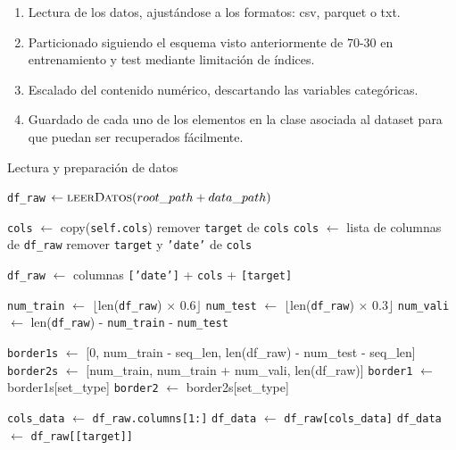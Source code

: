 \begin{enumerate}
	\item Lectura de los datos, ajustándose a los formatos: csv, parquet o txt.
	\item Particionado siguiendo el esquema visto anteriormente de 70-30 en entrenamiento y test mediante limitación de índices.
	\item Escalado del contenido numérico, descartando las variables categóricas.
	\item Guardado de cada uno de los elementos en la clase asociada al dataset para que puedan ser recuperados fácilmente.
\end{enumerate}

\begin{algorithm}[!ht]
	\caption{Lectura y preparación de datos}
	\begin{algorithmic}[1]
		
		\State \texttt{df\_raw} $\gets \Call{leerDatos}{root\_path + data\_path}$ 
		
		\State \texttt{cols} $\gets$ copy(\texttt{self.cols})
		\State remover \texttt{target} de \texttt{cols}
		\Else
		\State \texttt{cols} $\gets$ lista de columnas de \texttt{df\_raw}
		\State remover \texttt{target} y \texttt{'date'} de \texttt{cols}
		\EndIf
		
		\State \texttt{df\_raw} $\gets$ columnas \texttt{['date']} + \texttt{cols} + \texttt{[target]}
		
		\State \texttt{num\_train} $\gets$ $\lfloor$len(\texttt{df\_raw}) $\times$ 0.6$\rfloor$
		\State \texttt{num\_test} $\gets$ $\lfloor$len(\texttt{df\_raw}) $\times$ 0.3$\rfloor$
		\State \texttt{num\_vali} $\gets$ len(\texttt{df\_raw}) - \texttt{num\_train} - \texttt{num\_test}
		
		\State \texttt{border1s} $\gets$ [0, num\_train - seq\_len, len(df\_raw) - num\_test - seq\_len]
		\State \texttt{border2s} $\gets$ [num\_train, num\_train + num\_vali, len(df\_raw)]
		\State \texttt{border1} $\gets$ border1s[set\_type]
		\State \texttt{border2} $\gets$ border2s[set\_type]
		
		
		\State \texttt{cols\_data} $\gets$ \texttt{df\_raw.columns[1:]}
		\State \texttt{df\_data} $\gets$ \texttt{df\_raw[cols\_data]}
		\State \texttt{df\_data} $\gets$ \texttt{df\_raw[[target]]}
		\EndIf
		

\end{algorithmic}
\end{algorithm}
